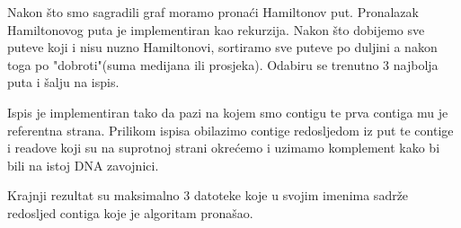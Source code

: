 Nakon što smo sagradili graf moramo pronaći Hamiltonov put. Pronalazak Hamiltonovog puta je implementiran kao rekurzija. Nakon što dobijemo sve puteve koji i nisu nuzno Hamiltonovi, sortiramo sve puteve po duljini a nakon toga po "dobroti"(suma medijana ili prosjeka). Odabiru se trenutno 3 najbolja puta i šalju na ispis. 


Ispis je implementiran tako da pazi na kojem smo contigu te prva contiga mu je referentna strana. Prilikom ispisa obilazimo contige redosljedom iz put te contige i readove koji su na suprotnoj strani okrećemo i uzimamo komplement kako bi bili na istoj DNA zavojnici.  


Krajnji rezultat su maksimalno 3 datoteke koje u svojim imenima sadrže redosljed contiga koje je algoritam pronašao. 



